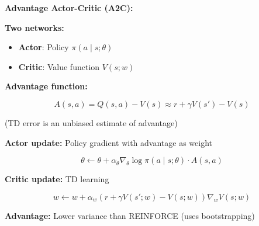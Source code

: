 \begin{seanbox}{5.9}
\textbf{Advantage Actor-Critic (A2C):}

\textbf{Two networks:}
\begin{itemize}
    \item \textbf{Actor}: Policy $\pi(a \mid s; \theta)$
    \item \textbf{Critic}: Value function $V(s; w)$
\end{itemize}

\textbf{Advantage function:}

\begin{equation}
    A(s, a) = Q(s, a) - V(s) \approx r + \gamma V(s') - V(s)
\end{equation}

(TD error is an unbiased estimate of advantage)

\textbf{Actor update:} Policy gradient with advantage as weight

\begin{equation}
    \theta \leftarrow \theta + \alpha_\theta \nabla_\theta \log \pi(a \mid s; \theta) \cdot A(s, a)
\end{equation}

\textbf{Critic update:} TD learning

\begin{equation}
    w \leftarrow w + \alpha_w (r + \gamma V(s'; w) - V(s; w)) \nabla_w V(s; w)
\end{equation}

\textbf{Advantage:} Lower variance than REINFORCE (uses bootstrapping)
\end{seanbox}

